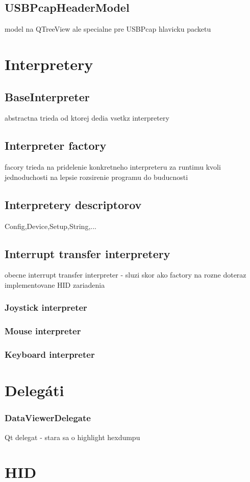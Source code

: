 \subsection{USBPcapHeaderModel}
model na QTreeView ale specialne pre USBPcap hlavicku packetu
\section{Interpretery}
\subsection{BaseInterpreter}
abstractna trieda od ktorej dedia vsetkz interpretery
\subsection{Interpreter factory}
facory trieda na pridelenie konkretneho interpreteru za runtimu kvoli jednoduchosti na lepsie rozsirenie programu do buducnosti
\subsection{Interpretery descriptorov}
Config,Device,Setup,String,...
\subsection{Interrupt transfer interpretery}
obecne interrupt transfer interpreter - sluzi skor ako factory na rozne doteraz implementovane HID zariadenia
\subsubsection{Joystick interpreter}
\subsubsection{Mouse interpreter}
\subsubsection{Keyboard interpreter}
\section{Delegáti}
\subsubsection{DataViewerDelegate}
Qt delegat - stara sa o highlight hexdumpu
\section{HID}

